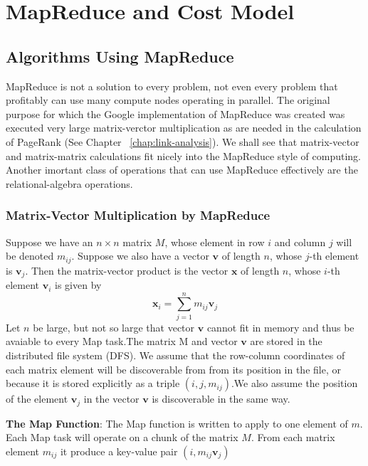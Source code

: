 \chapter{MapReduce and Cost Model}\label{chap:map-reduce-cost-model}

\section{Algorithms Using MapReduce}\label{sec:algorithms-using-mapreduce}

MapReduce is not a solution to every problem, not even every problem that profitably can use many compute nodes operating in parallel. The original purpose for which the Google implementation of MapReduce was created was executed very large matrix-verctor multiplication as are needed in the calculation of PageRank (See Chapter ~\ref{chap:link-analysis}). We shall see that matrix-vector and matrix-matrix calculations fit nicely into the MapReduce style of computing. Another imortant class of operations that can use MapReduce effectively are the relational-algebra operations.   

\subsection{Matrix-Vector Multiplication by MapReduce}\label{subsec:matrix-vector-multiplication}

Suppose we have an $n \times n$ matrix $M$, whose element in row $i$ and column $j$ will be denoted $m_{ij}$. Suppose we also have a vector $\mathbf{v}$ of length $n$, whose $j$-th element is $\mathbf{v}_j$. Then the matrix-vector product is the vector $\mathbf{x}$ of length $n$, whose $i$-th element $\mathbf{v}_i$ is given by 
\begin{equation*}
    \mathbf{x}_i = \sum_{j=1}^n m_{ij} \mathbf{v}_j
\end{equation*}
Let $n$ be large, but not so large that vector $\mathbf{v}$ cannot fit in memory and thus be avaiable to every Map task.The matrix M and vector $\mathbf{v}$ are stored in the distributed file system (DFS). We assume that the row-column coordinates of each matrix element will be discoverable from from its position in the file, or because it is stored explicitly as a triple $(i, j, m_{ij})$.We also assume the position of the element $\mathbf{v}_j$ in the vector $\mathbf{v}$ is discoverable in the same way.

\textbf{The Map Function}: The Map function is written to apply to one element of $m$. Each Map task will operate on a chunk of the matrix $M$. From each matrix element $m_{ij}$ it produce a key-value pair $(i, m_{ij}\mathbf{v}_j)$

